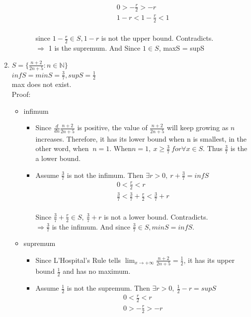 \documentclass[]{exam}
\begin{document}
\begin{questions}
\begin{enumerate}[label = (\alph*)]
\begin{itemize}
\begin{itemize}
\begin{gather*}
				0 > -\frac{r}{2} > -r \\		
				1 - r < 1 - \frac{r}{2} < 1
			\end{gather*}
			\\ since $1 - \frac{r}{2} \in S, 1 - r$ is not the upper bound. Contradicts.
			\\ $\Rightarrow$ 1 is the supremum. And Since $1 \in S$, maxS = supS
		\end{itemize}
	\end{itemize}
	\item $S = \{\frac{n+2}{2n+5}:n \in \mathbb{N}\}$
	\\$infS = minS = \frac{3}{7}, supS = \frac{1}{2}$
	\\max does not exist.
	\\Proof:
	\begin{itemize}
		\item infimum
		\begin{itemize}
			\item Since $\frac{d}{dn}\frac{n+2}{2n+5}$ is positive, the value of $\frac{n+2}{2n+5}$ will keep growing as $n$ increases. Therefore, it has its lower bound when n is smallest, in the other word, when $\ n = 1$. When$n = 1,\ x \geq \frac{3}{7}\ for \forall x \in S$. Thus $\frac{3}{7}$ is the a lower bound.
			\item Assume $\frac{3}{7}$ is not the infimum. Then $\exists r > 0,\ r + \frac{3}{7} = infS$
			\begin{gather*}
			0 < \frac{r}{2} < r \\
			\frac{3}{7} < \frac{3}{7} + \frac{r}{2} < \frac{3}{7} + r
			\end{gather*}
			\\ Since $\frac{3}{7} + \frac{r}{2} \in S,\ \frac{3}{7} + r$ is not a lower bound. Contradicts.
			\\ $\Rightarrow \frac{3}{7}$ is the infimum. And since $\frac{3}{7} \in S, minS = infS$.
		\end{itemize}
		\item supremum
		\begin{itemize}
			\item Since L'Hospital's Rule tells $\lim_{x \to +\infty}\frac{n+2}{2n+5} = \frac{1}{2}$, it has its upper bound $\frac{1}{2}$ and has no maximum.
			\item Assume $\frac{1}{2}$ is not the supremum. Then $\exists r > 0,\ \frac{1}{2} - r = supS$
			\begin{gather*}
			0 < \frac{r}{2} < r \\
			0 > -\frac{r}{2} > -r \\

\end{gather*}
\end{itemize}
\end{itemize}
\end{enumerate}
\end{questions}
\end{document}
